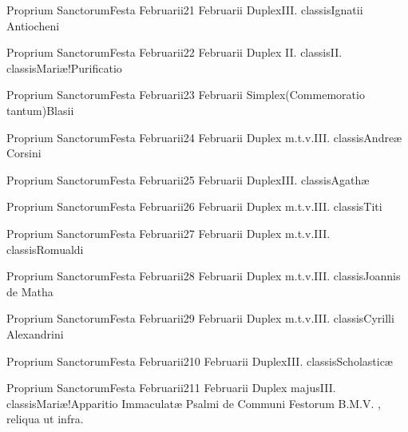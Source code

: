 \documentclass[nocturnale-romanum.tex]{subfiles}
\begin{document}

	{Proprium Sanctorum}{Festa Februarii}{2}{1 Februarii}
	{Duplex}{III. classis}{Ignatii Antiocheni}
	{}
	{}

	{Proprium Sanctorum}{Festa Februarii}{2}{2 Februarii}
	{Duplex II. classis}{II. classis}{Mariæ!Purificatio}
	{}
	{}

	{Proprium Sanctorum}{Festa Februarii}{2}{3 Februarii}
	{Simplex}{(Commemoratio tantum)}{Blasii}
	{}
	{}

	{Proprium Sanctorum}{Festa Februarii}{2}{4 Februarii}
	{Duplex m.t.v.}{III. classis}{Andreæ Corsini}
	{}
	{}

	{Proprium Sanctorum}{Festa Februarii}{2}{5 Februarii}
	{Duplex}{III. classis}{Agathæ}
	{}
	{}

	{Proprium Sanctorum}{Festa Februarii}{2}{6 Februarii}
	{Duplex m.t.v.}{III. classis}{Titi}
	{}
	{}

	{Proprium Sanctorum}{Festa Februarii}{2}{7 Februarii}
	{Duplex m.t.v.}{III. classis}{Romualdi}
	{}
	{}

	{Proprium Sanctorum}{Festa Februarii}{2}{8 Februarii}
	{Duplex m.t.v.}{III. classis}{Joannis de Matha}
	{}
	{}

	{Proprium Sanctorum}{Festa Februarii}{2}{9 Februarii}
	{Duplex m.t.v.}{III. classis}{Cyrilli Alexandrini}
	{}
	{}

	{Proprium Sanctorum}{Festa Februarii}{2}{10 Februarii}
	{Duplex}{III. classis}{Scholasticæ}
	{}
	{}

	{Proprium Sanctorum}{Festa Februarii}{2}{11 Februarii}
	{Duplex majus}{III. classis}{Mariæ!Apparitio Immaculatæ}
	{Psalmi de Communi Festorum B.M.V. \pageref{M-CBMV}, reliqua ut infra.}
	{}
\end{document}
